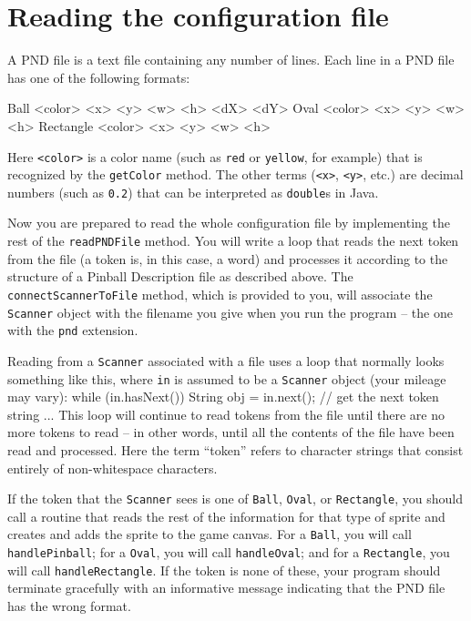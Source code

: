 \documentclass[12pt]{article}
\newenvironment{qv}%
  {\quote
   \verbatim}%
  {\endverbatim
   \endquote}
\begin{document}
\section*{Reading the configuration file}

A PND file is a text file containing
any number of lines.
Each line in a PND file has one of the following formats:

\begin{qv}
Ball <color> <x> <y> <w> <h> <dX> <dY>
Oval <color> <x> <y> <w> <h>
Rectangle <color> <x> <y> <w> <h>
\end{qv}

Here \verb'<color>' is a color name
(such as \verb'red' or \verb'yellow', for example)
that is recognized by the \verb'getColor' method.
The other terms (\verb'<x>', \verb'<y>', etc.)
are decimal numbers (such as \verb'0.2')
that can be interpreted as \verb'double's in Java.

Now you are prepared to read the whole configuration file
by implementing the rest of the \verb'readPNDFile' method.
You will write a loop that
reads the next token from the file
(a token is, in this case, a word)
and processes it according to the structure
of a Pinball Description file as described above.
The \verb'connectScannerToFile' method,
which is provided to you,
will associate the \verb'Scanner' object
with the filename you give when you run the program --
the one with the \verb'pnd' extension.

Reading from a \verb'Scanner' associated with a file
uses a loop that normally looks something like this,
where \verb'in' is assumed to be a \verb'Scanner' object
(your mileage may vary):
\begin{qv}
while (in.hasNext()) {
    String obj = in.next(); // get the next token string
    ...
}
\end{qv}
This loop will continue to read tokens from the file
until there are no more tokens to read --
in other words, until all the contents
of the file have been read and processed.
Here the term ``token'' refers
to character strings that consist entirely
of non-whitespace characters.

If the token that the \verb'Scanner' sees
is one of \verb'Ball', \verb'Oval', or \verb'Rectangle',
you should call a routine that reads the rest of the information for that
type of sprite and creates and adds the sprite to the game canvas.
For a \verb'Ball', you will call \verb'handlePinball';
for a \verb'Oval', you will call \verb'handleOval'; and
for a \verb'Rectangle', you will call \verb'handleRectangle'.
If the token is none of these,
your program should terminate gracefully
with an informative message indicating
that the PND file has the wrong format.
\end{document}
